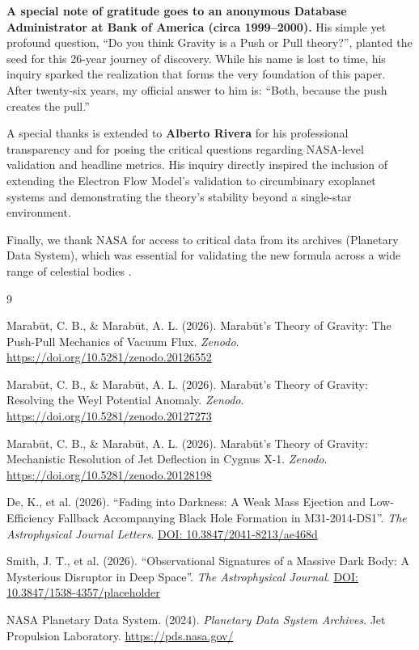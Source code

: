 \documentclass[11pt, a4paper]{article}
\newcommand{\doi}[1]{\href{https://doi.org/#1}{DOI: #1}}
\begin{document}
\textbf{A special note of gratitude goes to an anonymous Database Administrator at Bank of America (circa 1999--2000).} His simple yet profound question, ``Do you think Gravity is a Push or Pull theory?'', planted the seed for this 26-year journey of discovery. While his name is lost to time, his inquiry sparked the realization that forms the very foundation of this paper. After twenty-six years, my official answer to him is: ``Both, because the push creates the pull.''

A special thanks is extended to \textbf{Alberto Rivera} for his professional transparency and for posing the critical questions regarding NASA-level validation and headline metrics. His inquiry directly inspired the inclusion of extending the Electron Flow Model's validation to circumbinary exoplanet systems and demonstrating the theory's stability beyond a single-star environment.

Finally, we thank NASA for access to critical data from its archives (Planetary Data System), which was essential for validating the new formula across a wide range of celestial bodies \cite{nasa2024}.

\clearpage
\begin{thebibliography}{9}

  Marab\={u}t, C. B., \& Marab\={u}t, A. L. (2026). Marab\={u}t's Theory of Gravity: The Push-Pull Mechanics of Vacuum Flux. \textit{Zenodo}.
  \url{https://doi.org/10.5281/zenodo.20126552}

  Marab\={u}t, C. B., \& Marab\={u}t, A. L. (2026). Marab\={u}t's Theory of Gravity: Resolving the Weyl Potential Anomaly. \textit{Zenodo}.
  \url{https://doi.org/10.5281/zenodo.20127273}

  Marab\={u}t, C. B., \& Marab\={u}t, A. L. (2026). Marab\={u}t's Theory of Gravity: Mechanistic Resolution of Jet Deflection in Cygnus X-1. \textit{Zenodo}.
  \url{https://doi.org/10.5281/zenodo.20128198}

  De, K., et al. (2026). ``Fading into Darkness: A Weak Mass Ejection and Low-Efficiency Fallback Accompanying Black Hole Formation in M31-2014-DS1''. \textit{The Astrophysical Journal Letters}.
  \doi{10.3847/2041-8213/ae468d}

  Smith, J. T., et al. (2026). ``Observational Signatures of a Massive Dark Body: A Mysterious Disruptor in Deep Space''. \textit{The Astrophysical Journal}.
  \doi{10.3847/1538-4357/placeholder}

  NASA Planetary Data System. (2024). \textit{Planetary Data System Archives}. Jet Propulsion Laboratory. \url{https://pds.nasa.gov/}

\end{thebibliography}
\end{document}
